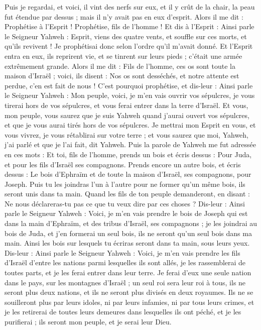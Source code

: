 \begin{multicols}{2}
Puis je regardai, et voici, il vint des nerfs sur eux, et il y crût de la chair, la peau fut étendue par dessus ; mais il n’y avait pas en eux d’esprit.
Alors il me dit : Prophétise à l'Esprit ! Prophétise, fils de l’homme ! Et dis à l'Esprit : Ainsi parle le Seigneur Yahweh : Esprit, viens des quatre vents, et souffle sur ces morts, et qu'ils revivent !
Je prophétisai donc selon l’ordre qu’il m'avait donné. Et l'Esprit entra en eux, ils reprirent vie, et se tinrent sur leurs pieds ; c’était une armée extrêmement grande.
Alors il me dit : Fils de l’homme, ces os sont toute la maison d'Israël ; voici, ils disent : Nos os sont desséchés, et notre attente est perdue, c'en est fait de nous !
C'est pourquoi prophétise, et dis-leur : Ainsi parle le Seigneur Yahweh : Mon peuple, voici, je m'en vais ouvrir vos sépulcres, je vous tirerai hors de vos sépulcres, et vous ferai entrer dans la terre d'Israël\FTNT{}.
Et vous, mon peuple, vous saurez que je suis Yahweh quand j'aurai ouvert vos sépulcres, et que je vous aurai tirés hors de vos sépulcres.
Je mettrai mon Esprit en vous, et vous vivrez, je vous rétablirai sur votre terre ; et vous saurez que moi, Yahweh, j'ai parlé et que je l'ai fait, dit Yahweh.
Puis la parole de Yahweh me fut adressée en ces mots :
Et toi, fils de l’homme, prends un bois et écris dessus : Pour Juda, et pour les fils d'Israël ses compagnons. Prends encore un autre bois, et écris dessus : Le bois d'Ephraïm et de toute la maison d'Israël, ses compagnons, pour Joseph.
Puis tu les joindras l'un à l'autre pour ne former qu'un même bois, ils seront unis dans ta main.
Quand les fils de ton peuple demanderont, en disant : Ne nous déclareras-tu pas ce que tu veux dire par ces choses ?
Dis-leur : Ainsi parle le Seigneur Yahweh : Voici, je m'en vais prendre le bois de Joseph qui est dans la main d'Ephraïm, et des tribus d'Israël, ses compagnons ; je les joindrai au bois de Juda, et j’en formerai un seul bois, ils ne seront qu'un seul bois dans ma main.
Ainsi les bois sur lesquels tu écriras seront dans ta main, sous leurs yeux.
Dis-leur : Ainsi parle le Seigneur Yahweh : Voici, je m'en vais prendre les fils d'Israël d'entre les nations parmi lesquelles ils sont allés, je les rassemblerai de toutes parts, et je les ferai entrer dans leur terre.
Je ferai d’eux une seule nation dans le pays, sur les montagnes d'Israël ; un seul roi sera leur roi à tous, ils ne seront plus deux nations, et ils ne seront plus divisés en deux royaumes\FTNT{}.
Ils ne se souilleront plus par leurs idoles, ni par leurs infamies, ni par tous leurs crimes, et je les retirerai de toutes leurs demeures dans lesquelles ils ont péché, et je les purifierai ; ils seront mon peuple, et je serai leur Dieu\FTNT{}.

\end{multicols}
